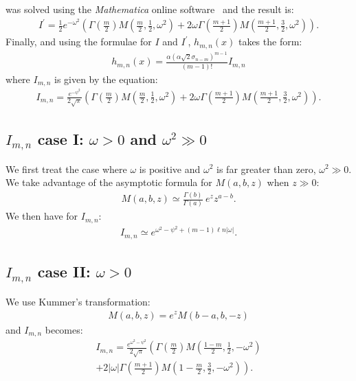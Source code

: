 \documentclass[preprint,12pt]{elsarticle}
\begin{document}
was solved using the \emph{Mathematica} online software~\cite{math} and the result is:
\begin{align}
I^\prime = \frac{1}{2} e^{-\omega^2} 
\left(  \Gamma\left( \frac{m}{2} \right) M\left( \frac{m}{2}, \frac{1}{2}, \omega^2 \right)  + 2\omega \Gamma\left( \frac{m+1}{2} \right) M\left(\frac{m+1}{2}, \frac{3}{2}, \omega^2  \right)  \right).  
\end{align}
Finally, and using the formulae for $I$ and $I^\prime$, $h_{m,n}(x)$ takes the form:
\begin{align}
h_{m,n}(x) =  \frac{ \alpha (\alpha\sqrt{2} \sigma_{n-m})^{m-1}}{(m-1)!}  I_{m,n}
\end{align} 
where $I_{m,n}$  is given by the equation:
\begin{align}
I_{m,n} = \frac{ e^{-\psi^2} }{ 2\sqrt{\pi} }\left( \Gamma\left( \frac{m}{2} \right) M\left( \frac{m}{2}, \frac{1}{2}, \omega^2 \right)  + 2\omega \Gamma\left( \frac{m+1}{2} \right) M\left(\frac{m+1}{2}, \frac{3}{2}, \omega^2 \right) \right).  
\end{align}

\subsection*{$I_{m,n}$ case I: $\omega> 0$ and $\omega^2 \gg 0$ }
%

We first treat the case where $\omega$ is positive and $\omega^2$ is far greater than zero, $\omega^2 \gg 0$.  
We take advantage of the asymptotic formula for $M(a,b,z)$ when $z \gg 0$:
\begin{align}
M(a,b,z) \simeq \frac{\Gamma (b)}{\Gamma(a)} \  e^z z^{a-b}.
\end{align}
We then have for $I_{m,n}$:
\begin{align}
 I_{m,n} \simeq e^{\omega^2 - \psi^2 + (m-1) \ell n |\omega|}   .
\end{align}

\subsection*{$I_{m,n}$ case II: $\omega >0$}
%

We use Kummer's transformation:
\begin{align}
M(a,b,z) = e^z M(b-a,b,-z)
\end{align}
and $I_{m,n}$ becomes:
\begin{align}
I_{m,n} = \frac{ e^{\omega^2 -\psi^2 } }{2\sqrt{\pi}} \left(  \Gamma\left( \frac{m}{2} \right) M\left(\frac{1-m}{2}, \frac{1}{2}, -\omega^2 \right)  \nonumber \right. \\ \left. 
+ 2|\omega| \Gamma\left( \frac{m+1}{2} \right) M\left(1-\frac{m}{2}, \frac{3}{2}, -\omega^2 \right)     \right).
\end{align}
\end{document}
